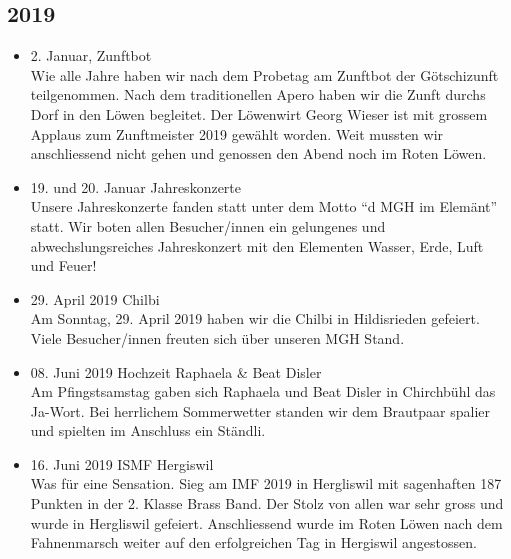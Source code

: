 \subsection*{2019}
\begin{history}

    \begin{itemize}

        \item 2. Januar, Zunftbot\\
              Wie alle Jahre haben wir nach dem Probetag am Zunftbot der
              Götschizunft teilgenommen. Nach dem traditionellen Apero haben wir
              die Zunft durchs Dorf in den Löwen begleitet. Der Löwenwirt Georg
              Wieser ist mit grossem Applaus zum Zunftmeister 2019 gewählt
              worden. Weit mussten wir anschliessend nicht gehen und genossen
              den Abend noch im Roten Löwen.

        \item 19. und 20. Januar Jahreskonzerte\\
              Unsere Jahreskonzerte fanden statt unter dem Motto \enquote{d MGH
                  im Elemänt} statt. Wir boten allen Besucher/innen ein
              gelungenes und abwechslungsreiches Jahreskonzert mit den
              Elementen Wasser, Erde, Luft und Feuer!

        \item 29. April 2019 Chilbi\\
              Am Sonntag, 29. April 2019 haben wir die Chilbi in Hildisrieden
              gefeiert. Viele Besucher/innen freuten sich über unseren MGH
              Stand.

        \item 08. Juni 2019 Hochzeit Raphaela \& Beat Disler\\
              Am Pfingstsamstag gaben sich Raphaela und Beat Disler in
              Chirchbühl das Ja-Wort. Bei herrlichem Sommerwetter standen wir
              dem Brautpaar spalier und spielten im Anschluss ein Ständli.

        \item 16. Juni 2019 ISMF Hergiswil\\
              Was für eine Sensation. Sieg am IMF 2019 in Hergliswil mit
              sagenhaften 187 Punkten in der 2. Klasse Brass Band. Der Stolz von
              allen war sehr gross und wurde in Hergliswil gefeiert.
              Anschliessend wurde im Roten Löwen nach dem Fahnenmarsch weiter
              auf den erfolgreichen Tag in Hergiswil angestossen.


\end{itemize}
\end{history}
